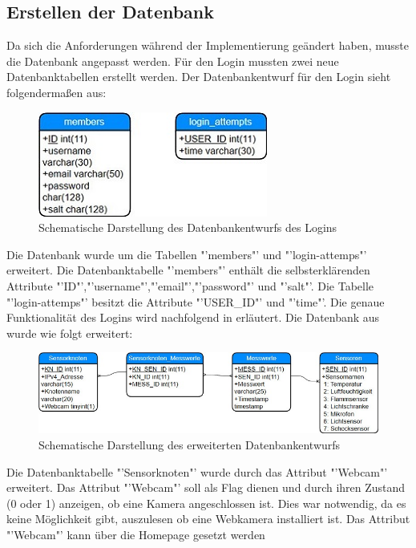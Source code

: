 \subsection{Erstellen der Datenbank}
Da sich die Anforderungen während der Implementierung geändert haben, musste die Datenbank angepasst werden. Für den Login mussten zwei neue Datenbanktabellen erstellt werden. Der Datenbankentwurf für den Login sieht folgendermaßen aus:
\begin{figure}[htp]
	\begin{center}
		\includegraphics{Bilder/Kapitel4/db_login.jpg}
		\caption[Schematische Darstellung des Datenbankentwurfs des Logins]{Schematische Darstellung des Datenbankentwurfs des Logins}
		\label{fig:Datenbankentwurf_login}
	\end{center}
\end{figure}
Die Datenbank wurde um die Tabellen "'members"' und "'login-attemps"' erweitert. Die Datenbanktabelle "'members"' enthält die selbsterklärenden Attribute "'ID"',"'username"',"'email"',"'password"' und "'salt"'. Die Tabelle "'login-attemps"' besitzt die Attribute "'USER\_ID"' und "'time"'. Die genaue Funktionalität des Logins wird nachfolgend in  erläutert.
Die Datenbank aus  wurde wie folgt erweitert:
\begin{figure}[htp]
	\includegraphics[width=\textwidth]{Bilder/Kapitel4/Datenbankentwurf2.jpg}
	\caption[Schematische Darstellung des erweiterten Datenbankentwurfs]{Schematische Darstellung des erweiterten Datenbankentwurfs}
	\label{fig:Datenbankentwurf_erweiterung}
\end{figure}
Die Datenbanktabelle "'Sensorknoten"' wurde durch das Attribut "'Webcam"' erweitert. Das Attribut "'Webcam"' soll als Flag dienen und durch ihren Zustand (0 oder 1) anzeigen, ob eine Kamera angeschlossen ist. Dies war notwendig, da es keine Möglichkeit gibt, auszulesen ob eine Webkamera installiert ist. Das Attribut "'Webcam"' kann über die Homepage gesetzt werden

